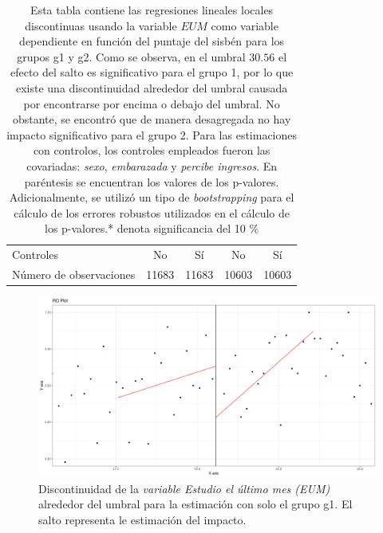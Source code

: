 \documentclass[AER]{AEA}
\begin{document}
\begin{table}[h!]
\begin{tabular}{lcccc}
Controles               & No                                                                    & Sí                                                                    & No                                                                    & Sí                                                                    \\
Número de observaciones & 11683                                                                 & 11683                                                                 & 10603                                                                 & 10603                                                                 \\ \hline
\end{tabular}
\caption{Esta tabla contiene las regresiones lineales locales discontinuas usando la variable $EUM$ como variable dependiente en función del puntaje del sisbén para los grupos g1 y g2. Como se observa, en el umbral $30.56$ el efecto del salto es significativo para el grupo 1, por lo que existe una discontinuidad alrededor del umbral causada por encontrarse por encima o debajo del umbral. No obstante, se encontró que de manera desagregada no hay impacto significativo para el grupo 2. Para las estimaciones con controlos, los controles empleados fueron las covariadas: \textit{sexo}, \textit{embarazada} y \textit{percibe ingresos}. En paréntesis se encuentran los valores de los p-valores. Adicionalmente, se utilizó un tipo de \textit{bootstrapping} para el cálculo de los errores robustos utilizados en el cálculo de los p-valores.* denota significancia del 10 \%}
\label{tab:reg_main_grupos}
\end{table}

\begin{figure}[h!]
    \centering
    \includegraphics[scale = 0.35]{imagenes/estimaxs_adicionales/g1_estimax.png}
    \caption{Discontinuidad de la \textit{variable Estudio el último mes (EUM)} alrededor del umbral para la estimación con solo el grupo g1. El salto representa le estimación del impacto.}
    \label{fig:estimax_main_g1}
\end{figure}
\end{document}
